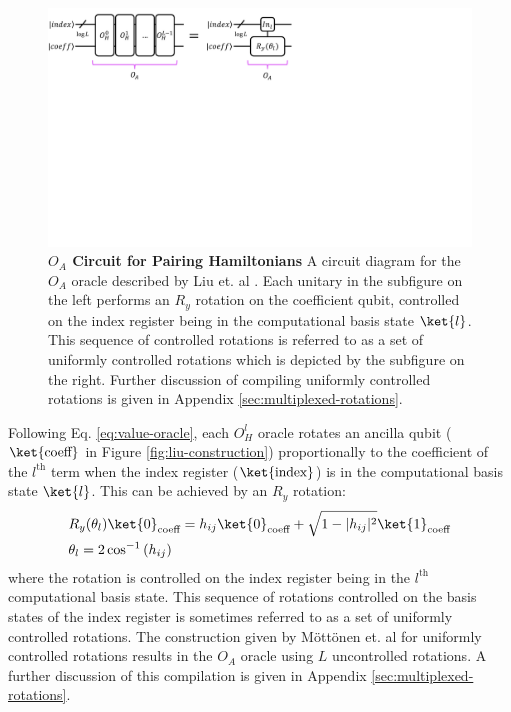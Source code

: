 \begin{figure}[h]
    \includegraphics[width=12cm]{figures/liu-O_A.pdf}
    \caption{
        \textbf{$O_A$ Circuit for Pairing Hamiltonians}
        A circuit diagram for the $O_A$ oracle described by Liu et. al \cite{liu2024efficient}.
        Each unitary in the subfigure on the left performs an $R_y$ rotation on the coefficient qubit, controlled on the index register being in the computational basis state $\ket{l}$.
        This sequence of controlled rotations is referred to as a set of uniformly controlled rotations which is depicted by the subfigure on the right.
        Further discussion of compiling uniformly controlled rotations is given in Appendix \ref{sec:multiplexed-rotations}.
    }
    \label{fig:liu-O_A}
\end{figure}

Following Eq. \ref{eq:value-oracle}, each $O_H^l$ oracle rotates an ancilla qubit ($\ket{\text{coeff}}$ in Figure \ref{fig:liu-construction}) proportionally to the coefficient of the $l^\text{th}$ term when the index register ($\ket{\text{index}}$) is in the computational basis state $\ket{l}$.
This can be achieved by an $R_y$ rotation:
\begin{equation}
    \begin{split}
        & R_y (\theta_l) \ket{0}_\text{coeff} = h_{ij} \ket{0}_\text{coeff} + \sqrt{1 - |h_{ij}|^2} \ket{1}_\text{coeff} \\
        & \theta_l = 2 \cos^{-1}{(h_{ij})}
    \end{split}
\end{equation}
where the rotation is controlled on the index register being in the $l^\text{th}$ computational basis state.
This sequence of rotations controlled on the basis states of the index register is sometimes referred to as a set of uniformly controlled rotations.
The construction given by Möttönen et. al \cite{mottonen2004transformation} for uniformly controlled rotations results in the $O_A$ oracle using $L$ uncontrolled rotations.
A further discussion of this compilation is given in Appendix \ref{sec:multiplexed-rotations}.

